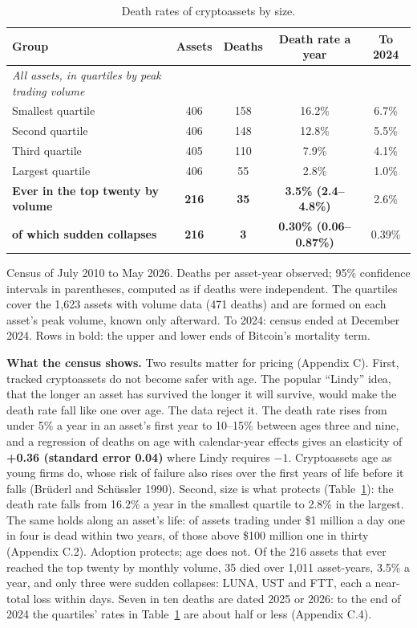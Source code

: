 \documentclass[11pt]{article}
\begin{document}
\begin{table}[!htb]\centering\small
\caption{Death rates of cryptoassets by size.}
\label{tab:size}
\begin{tabular}{lcccc}
\toprule
Group & Assets & Deaths & Death rate a year & To 2024 \\
\midrule
\emph{All assets, in quartiles by peak trading volume} & & & & \\
\quad Smallest quartile & 406 & 158 & 16.2\% & 6.7\% \\
\quad Second quartile & 406 & 148 & 12.8\% & 5.5\% \\
\quad Third quartile & 405 & 110 & 7.9\% & 4.1\% \\
\quad Largest quartile & 406 & 55 & 2.8\% & 1.0\% \\
\textbf{Ever in the top twenty by volume} & \textbf{216} & \textbf{35} & \textbf{3.5\% (2.4--4.8\%)} & 2.6\% \\
\quad \textbf{of which sudden collapses} & \textbf{216} & \textbf{3} & \textbf{0.30\% (0.06--0.87\%)} & 0.39\% \\
\bottomrule
\end{tabular}
\par\smallskip\parbox{0.74\textwidth}{\footnotesize Census of July 2010 to May 2026. Deaths per asset-year observed; 95\% confidence intervals in parentheses, computed as if deaths were independent. The quartiles cover the 1,623 assets with volume data (471 deaths) and are formed on each asset's peak volume, known only afterward. To 2024: census ended at December 2024. Rows in bold: the upper and lower ends of Bitcoin's mortality term.}
\end{table}

\textbf{What the census shows.} Two results matter for pricing (Appendix C). First, tracked cryptoassets do not become safer with age. The popular ``Lindy'' idea, that the longer an asset has survived the longer it will survive, would make the death rate fall like one over age. The data reject it. The death rate rises from under 5\% a year in an asset's first year to 10--15\% between ages three and nine, and a regression of deaths on age with calendar-year effects gives an elasticity of \textbf{+0.36 (standard error 0.04)} where Lindy requires $-1$. Cryptoassets age as young firms do, whose risk of failure also rises over the first years of life before it falls (Br\"uderl and Sch\"ussler 1990). Second, size is what protects (Table~\ref{tab:size}): the death rate falls from 16.2\% a year in the smallest quartile to 2.8\% in the largest. The same holds along an asset's life: of assets trading under \$1 million a day one in four is dead within two years, of those above \$100 million one in thirty (Appendix C.2). Adoption protects; age does not. Of the 216 assets that ever reached the top twenty by monthly volume, 35 died over 1,011 asset-years, 3.5\% a year, and only three were sudden collapses: LUNA, UST and FTT, each a near-total loss within days. Seven in ten deaths are dated 2025 or 2026: to the end of 2024 the quartiles' rates in Table~\ref{tab:size} are about half or less (Appendix C.4).
\end{document}
